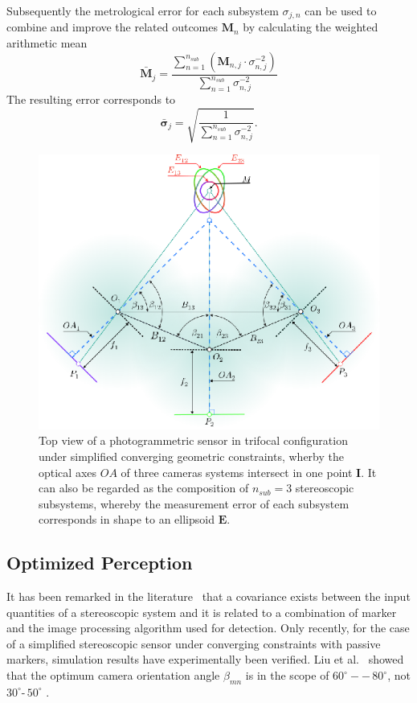 \documentclass[5p,times,procedia]{elsarticle}
\begin{document}
Subsequently the metrological error for each subsystem $\sigma_{j,n}$ can be used to combine and improve the related outcomes $\mathbf{M}_n$ by calculating the weighted arithmetic mean \cite{Price1972}
\begin{equation}
	\mathbf{\bar{M}}_{j} = \frac{\sum_{n=1}^{n_{sub}} \left( \mathbf{M}_{n,j} \cdot \sigma_{n,j}^{-2} \right)}{\sum_{n=1}^{n_{sub}} \sigma_{n,j}^{-2}}
\end{equation}
The resulting error corresponds to
\begin{equation}
	\mathbf{\bar{\sigma}}_{j} = \sqrt{ \frac{1}{\sum_{n=1}^{n_{sub}} \sigma_{n,j}^{-2}} }.
\end{equation}

\begin{figure}[bth]
	\centering
	\includegraphics[width=0.8\linewidth]{graphics/MixedErrorCuttingGeometry.eps}
	\caption{Top view of a photogrammetric sensor in trifocal configuration under simplified converging geometric constraints, wherby the optical axes $OA$ of three cameras systems intersect in one point $\mathbf{I}$.		
	It can also be regarded as the composition of $n_{sub}=3$ stereoscopic subsystems, whereby the measurement error of each subsystem corresponds in shape to an ellipsoid $\mathbf{E}$.}
	\label{fig:sub_sensors}
\end{figure}

\subsection{Optimized Perception}
It has been remarked in the literature~\cite{Di_Leo_2011} that a covariance exists between the input quantities of a stereoscopic system and it is related to a combination of marker and the image processing algorithm used for detection.
Only recently, for the case of a simplified stereoscopic sensor under converging constraints with passive markers, simulation results have experimentally been verified.
Liu et al.~\cite{Liu_2021} showed that the optimum camera orientation angle $\beta_{mn}$ is in the scope of $60^{\circ} --\, 80^{\circ}$, not $30^{\circ} \text{-}\, 50^{\circ}$ \cite{Yang2018,Fooladgar2013,Sankowski2017}.
\end{document}
